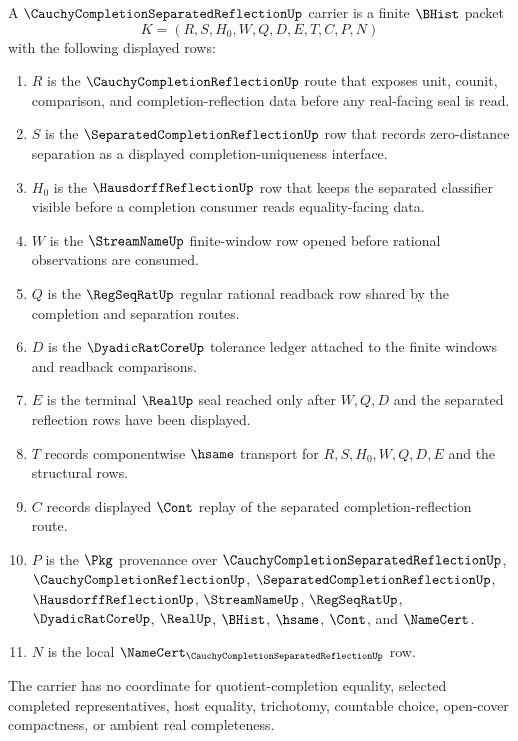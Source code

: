 \begin{definition}
\label{def:cauchy-completion-separated-reflection-carrier}
A $\CauchyCompletionSeparatedReflectionUp$ carrier is a finite $\BHist$ packet
$$
K=(R,S,H_0,W,Q,D,E,T,C,P,N)
$$
with the following displayed rows:
\begin{enumerate}
\item $R$ is the $\CauchyCompletionReflectionUp$ route that exposes unit, counit, comparison, and completion-reflection data before any real-facing seal is read.
\item $S$ is the $\SeparatedCompletionReflectionUp$ row that records zero-distance separation as a displayed completion-uniqueness interface.
\item $H_0$ is the $\HausdorffReflectionUp$ row that keeps the separated classifier visible before a completion consumer reads equality-facing data.
\item $W$ is the $\StreamNameUp$ finite-window row opened before rational observations are consumed.
\item $Q$ is the $\RegSeqRatUp$ regular rational readback row shared by the completion and separation routes.
\item $D$ is the $\DyadicRatCoreUp$ tolerance ledger attached to the finite windows and readback comparisons.
\item $E$ is the terminal $\RealUp$ seal reached only after $W,Q,D$ and the separated reflection rows have been displayed.
\item $T$ records componentwise $\hsame$ transport for $R,S,H_0,W,Q,D,E$ and the structural rows.
\item $C$ records displayed $\Cont$ replay of the separated completion-reflection route.
\item $P$ is the $\Pkg$ provenance over $\CauchyCompletionSeparatedReflectionUp$, $\CauchyCompletionReflectionUp$, $\SeparatedCompletionReflectionUp$, $\HausdorffReflectionUp$, $\StreamNameUp$, $\RegSeqRatUp$, $\DyadicRatCoreUp$, $\RealUp$, $\BHist$, $\hsame$, $\Cont$, and $\NameCert$.
\item $N$ is the local $\NameCert_{\CauchyCompletionSeparatedReflectionUp}$ row.
\end{enumerate}
The carrier has no coordinate for quotient-completion equality, selected completed representatives, host equality, trichotomy, countable choice, open-cover compactness, or ambient real completeness.
\end{definition}

